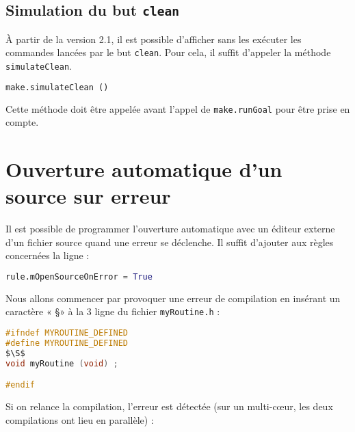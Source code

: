 \documentclass[a4paper,11pt]{extarticle}
\begin{document}
\subsection{Simulation du but \texttt{clean}}\label{simulationButClean}

À partir de la version 2.1, il est possible d'afficher sans les exécuter les commandes lancées par le but \texttt{clean}. Pour cela, il suffit d'appeler la méthode \texttt{simulateClean}.

\begin{lstlisting}[language=py]
  make.simulateClean ()
\end{lstlisting}

Cette méthode doit être appelée avant l'appel de \texttt{make.runGoal} pour être prise en compte.



\section{Ouverture automatique d'un source sur erreur}

Il est possible de programmer l'ouverture automatique avec un éditeur externe d'un fichier source quand une erreur se déclenche. Il suffit d'ajouter aux règles concernées la ligne :
\begin{lstlisting}[language=py]
  rule.mOpenSourceOnError = True
\end{lstlisting}


Nous allons commencer par provoquer une erreur de compilation en insérant un caractère « \S » à la 3 ligne du fichier \texttt{myRoutine.h} :
\begin{lstlisting}[mathescape,language=C]
#ifndef MYROUTINE_DEFINED
#define MYROUTINE_DEFINED
$\S$
void myRoutine (void) ;

#endif
\end{lstlisting}

Si on relance la compilation, l'erreur est détectée (sur un multi-cœur, les deux compilations ont lieu en parallèle) :
\end{document}
